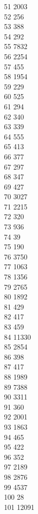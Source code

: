 { 51	2003 \\
 52	256 \\
 53	388 \\
 54	292 \\
 55	7832 \\
 56	2254 \\
 57	455 \\
 58	1954 \\
 59	229 \\
 60	525 \\
 61	294 \\
 62	340 \\
 63	339 \\
 64	555 \\
 65	413 \\
 66	377 \\
 67	297 \\
 68	347 \\
 69	427 \\
 70	3027 \\
 71	2215 \\
 72	320 \\
 73	936 \\
 74	39 \\
 75	190 \\
 76	3750 \\
 77	1063 \\
 78	1356 \\
 79	2765 \\
 80	1892 \\
 81	429 \\
 82	417 \\
 83	459 \\
 84	11330 \\
 85	2854 \\
 86	398 \\
 87	417 \\
 88	1989 \\
 89	7388 \\
 90	3311 \\
 91	360 \\
 92	2001 \\
 93	1863 \\
 94	465 \\
 95	422 \\
 96	352 \\
 97	2189 \\
 98	2876 \\
 99	4537 \\
 100	28 \\
 101	12091 \\
}
